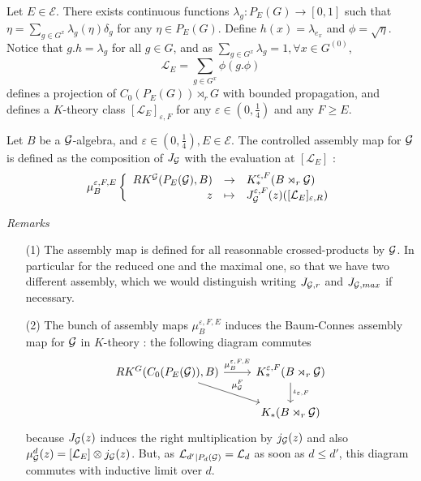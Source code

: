 Let $E\in\mathcal E$. There exists continuous functions $\lambda_g : P_E(G)\rightarrow [0,1]$ such that $\eta = \sum_{g\in G^x}\lambda_g(\eta) \delta_g$ for any $\eta\in P_E(G)$. Define $h(x)=\lambda_{e_x}$ and $\phi = \sqrt\eta$. Notice that $g.h = \lambda_g$ for all $g\in G$, and as $\sum_{g\in G^x}\lambda_g = 1 ,\forall x\in G^{(0)}$, 
\[\mathcal L_E =\sum_{g\in G^x} \phi(g.\phi)\]
defines a projection of $C_0(P_E(G))\rtimes_r G$ with bounded propagation, and defines a $K$-theory class $[\mathcal L_E]_{\varepsilon,F}$ for any $\varepsilon\in (0,\frac{1}{4})$ and any $F\geq E$.\\

\begin{definition}
Let $B$ be a $\mathcal G$-algebra, and $\varepsilon\in (0,\frac{1}{4}),E\in\mathcal E$. The controlled assembly map for $\mathcal G$ is defined as the composition of $J_\mathcal G$ with the evaluation at $[\mathcal L_E]$ :
\[\mu_B^{\varepsilon,F,E}\left\{
\begin{array}{rcl}
RK^\mathcal G(P_E(\mathcal G), B) & \rightarrow & K_*^{\epsilon, F}(B\rtimes_r \mathcal G)\\
z & \mapsto & J_\mathcal G^{\varepsilon, F}(z)([\mathcal L_E]_{\varepsilon , R})
\end{array}\right.\]
\end{definition}



\textit{Remarks}
\begin{itemize}
\item[(1)] The assembly map is defined for all reasonnable crossed-products by $\mathcal G$. In particular for the reduced one and the maximal one, so that we have two different assembly, which we would distinguish writing $J_{\mathcal G,r}$ and $J_{\mathcal G,max}$ if necessary.
\item[(2)] The bunch of assembly maps $\mu_B^{\varepsilon,F,E}$ induces the Baum-Connes assembly map for $\mathcal G$ in $K$-theory : the following diagram commutes
\[\begin{tikzcd}
RK^G(C_0(P_E(\G)),B) \arrow{r}{\mu_B^{\varepsilon,F,E}}\arrow{dr}{\mu_\G^F} & K_*^{\varepsilon, F}(B\rtimes_r \G)\arrow{d}{\iota_{\varepsilon,F}}\\ 
		&  K_*(B\rtimes_r \G)
\end{tikzcd}\]
because $J_\mathcal G(z)$ induces the right multiplication by $j_\mathcal G(z)$ and also $\mu_\mathcal G^d(z)=[\mathcal L_E]\otimes j_\mathcal G(z)$. But, as ${{\mathcal L}_{d'}}_{|P_d(\mathcal G)}=\mathcal L_d$ as soon as $d\leq d'$, this diagram commutes with inductive limit over $d$.\\
\end{itemize}

